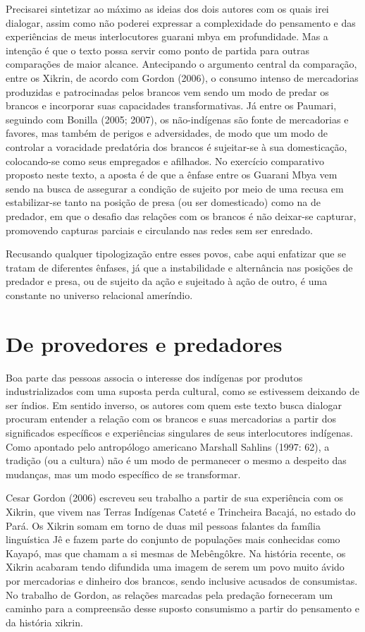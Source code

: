 {Precisarei sintetizar ao máximo as ideias dos dois autores com os quais
irei dialogar, assim como não poderei expressar a complexidade do
pensamento e das experiências de meus interlocutores guarani mbya em
profundidade. Mas a intenção é que o texto possa servir como ponto de
partida para outras comparações de maior alcance. Antecipando o
argumento central da comparação, entre os Xikrin, de acordo com Gordon
(2006), o consumo intenso de mercadorias produzidas e patrocinadas
pelos brancos vem sendo um modo de predar os brancos e incorporar suas
capacidades transformativas. Já entre os Paumari, seguindo com Bonilla
(2005; 2007), os não-indígenas são fonte de mercadorias e favores, mas
também de perigos e adversidades, de modo que um modo de controlar a
voracidade predatória dos brancos é sujeitar-se à sua domesticação,
colocando-se como seus empregados e afilhados. No exercício comparativo
proposto neste texto, a aposta é de que a ênfase entre os Guarani Mbya
vem sendo na busca de assegurar a condição de sujeito por meio de uma
recusa em estabilizar-se tanto na posição de presa (ou ser domesticado)
como na de predador, em que o desafio das relações com os brancos é não
deixar-se capturar, promovendo capturas parciais e circulando nas redes
sem ser enredado. 

Recusando qualquer tipologização entre esses povos, cabe aqui enfatizar
que se tratam de diferentes ênfases, já que a instabilidade e
alternância nas posições de predador e presa, ou de sujeito da ação e
sujeitado à ação de outro, é uma constante no universo relacional
ameríndio. 

\section{De provedores e predadores} 

Boa parte das pessoas associa o interesse dos indígenas por produtos
industrializados com uma suposta perda cultural, como se estivessem
deixando de ser índios. Em sentido inverso, os autores com quem este
texto busca dialogar procuram entender a relação com os brancos e suas
mercadorias a partir dos significados específicos e experiências
singulares de seus interlocutores indígenas. Como apontado pelo
antropólogo americano Marshall Sahlins (1997: 62), a tradição (ou a
cultura) não é um modo de permanecer o mesmo a despeito das mudanças,
mas um modo específico de se transformar.

Cesar Gordon (2006) escreveu seu trabalho a partir de sua experiência
com os Xikrin, que vivem nas Terras Indígenas Cateté e Trincheira
Bacajá, no estado do Pará. Os Xikrin somam em torno de duas mil pessoas
falantes da família linguística Jê e fazem parte do conjunto de
populações mais conhecidas como Kayapó, mas que chamam a si mesmas de
Mebêngôkre. Na história recente, os Xikrin acabaram tendo difundida uma
imagem de serem um povo muito ávido por mercadorias e dinheiro dos
brancos, sendo inclusive acusados de consumistas. No trabalho de
Gordon, as relações marcadas pela predação forneceram um caminho para a
compreensão desse suposto consumismo a partir do pensamento e da
história xikrin.

}

